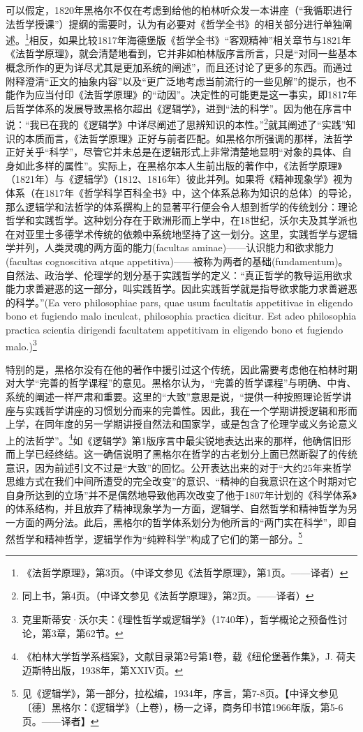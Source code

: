 可以假定，1820年黑格尔不仅在考虑到给他的柏林听众发一本讲座（“我循职进行法哲学授课”）提纲的需要时，认为有必要对《哲学全书》的相关部分进行单独阐述。\footnote{《法哲学原理》，第3页。（中译文参见《法哲学原理》，第1页。——译者）}相反，如果比较1817年海德堡版《哲学全书》“客观精神”相关章节与1821年《法哲学原理》，就会清楚地看到，它并非如柏林版序言所言，只是“对同一些基本概念所作的更为详尽尤其是更加系统的阐述”，而且还讨论了更多的东西。而通过附释澄清“正文的抽象内容”以及“更广泛地考虑当前流行的一些见解”的提示，也不能作为应当付印《法哲学原理》的“动因”。决定性的可能更是这一事实，即1817年后哲学体系的发展导致黑格尔超出《逻辑学》，进到“法的科学”。因为他在序言中说：“我已在我的《逻辑学》中详尽阐述了思辨知识的本性。”\footnote{同上书，第4页。（中译文参见《法哲学原理》，第2页。——译者）}就其阐述了“实践”知识的本质而言，《法哲学原理》正好与前者匹配。如黑格尔所强调的那样，法哲学正好关乎“科学”，尽管它并未总是在逻辑形式上非常清楚地显明“对象的具体、自身如此多样的属性”。实际上，在黑格尔本人生前出版的著作中，《法哲学原理》（1821年）与《逻辑学》（1812、1816年）彼此并列。如果将《精神现象学》视为体系（在1817年《哲学科学百科全书》中，这个体系总称为知识的总体）的导论，那么逻辑学和法哲学的体系撰构上的显著平行便会令人想到哲学的传统划分：理论哲学和实践哲学。这种划分存在于欧洲形而上学中，在18世纪，沃尔夫及其学派也在对亚里士多德学术传统的依赖中系统地坚持了这一划分。这里，实践哲学与逻辑学并列，人类灵魂的两方面的能力(facultas aminae)——认识能力和欲求能力(facultas cognoscitiva atque appetitiva)——被称为两者的基础(fundamentum)。自然法、政治学、伦理学的划分基于实践哲学的定义：“真正哲学的教导运用欲求能力求善避恶的这一部分，叫实践哲学。因此实践哲学就是指导欲求能力求善避恶的科学。”(Ea vero philosophiae pars, quae usum facultatis appetitivae in eligendo bono et fugiendo malo inculcat, philosophia practica dicitur. Est adeo philosophia practica scientia dirigendi facultatem appetitivam in eligendo bono et fugiendo malo.)\footnote{克里斯蒂安·沃尔夫：《理性哲学或逻辑学》（1740年），哲学概论之预备性讨论，第3章，第62节。}

特别的是，黑格尔没有在他的著作中援引过这个传统，因此需要考虑他在柏林时期对大学“完善的哲学课程”的意见。黑格尔认为，“完善的哲学课程”与明确、中肯、系统的阐述一样严肃和重要。这里的“大致”意思是说，“提供一种按照理论哲学讲座与实践哲学讲座的习惯划分而来的完善性。因此，我在一个学期讲授逻辑和形而上学，在同年度的另一学期讲授自然法和国家学，或是包含了伦理学或义务论意义上的法哲学”。\footnote{《柏林大学哲学系档案》，文献目录第2号第1卷，载《纽伦堡著作集》，J. 荷夫迈斯特出版，1938年，第XXIV页。}如《逻辑学》第1版序言中最尖锐地表达出来的那样，他确信旧形而上学已经终结。这一确信说明了黑格尔在哲学的古老划分上面已然断裂了的传统意识，因为前述引文不过是“大致”的回忆。公开表达出来的对于“大约25年来哲学思维方式在我们中间所遭受的完全改变”的意识、“精神的自我意识在这个时期对它自身所达到的立场”并不是偶然地导致他再次改变了他于1807年计划的《科学体系》的体系结构，并且放弃了精神现象学为一方面，逻辑学、自然哲学和精神哲学为另一方面的两分法。此后，黑格尔的哲学体系划分为他所言的“两门实在科学”，即自然哲学和精神哲学，逻辑学作为“纯粹科学”构成了它们的第一部分。\footnote{见《逻辑学》，第一部分，拉松编，1934年，序言，第7-8页。【中译文参见〔德〕黑格尔：《逻辑学》（上卷），杨一之译，商务印书馆1966年版，第5-6页。——译者】}

